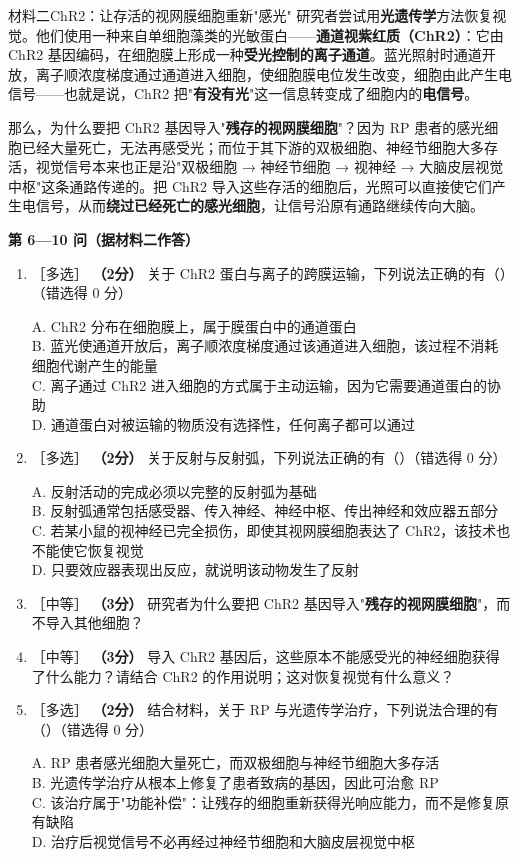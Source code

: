 \documentclass[UTF8,a4paper,11pt]{ctexart}
\newcommand{\pt}[1]{\textbf{（#1分）}}
\newcommand{\lv}[1]{{\small\color{deepgreen}［#1］}}
\newcommand{\tian}[1]{\underline{\hspace{#1}}}
\newcommand{\choice}[1]{\par\smallskip\noindent #1\par}
\begin{document}
\begin{matbox}{材料二\quad ChR2：让存活的视网膜细胞重新"感光"}
研究者尝试用\textbf{光遗传学}方法恢复视觉。他们使用一种来自单细胞藻类的光敏蛋白——\textbf{通道视紫红质（ChR2）}：它由 ChR2 基因编码，在细胞膜上形成一种\textbf{受光控制的离子通道}。蓝光照射时通道开放，离子顺浓度梯度通过通道进入细胞，使细胞膜电位发生改变，细胞由此产生电信号——也就是说，ChR2 把"\textbf{有没有光}"这一信息转变成了细胞内的\textbf{电信号}。

那么，为什么要把 ChR2 基因导入"\textbf{残存的视网膜细胞}"？因为 RP 患者的感光细胞已经大量死亡，无法再感受光；而位于其下游的双极细胞、神经节细胞大多存活，视觉信号本来也正是沿"双极细胞 → 神经节细胞 → 视神经 → 大脑皮层视觉中枢"这条通路传递的。把 ChR2 导入这些存活的细胞后，光照可以直接使它们产生电信号，从而\textbf{绕过已经死亡的感光细胞}，让信号沿原有通路继续传向大脑。
\end{matbox}

\begin{qbox}
\noindent\textbf{\color{deepgreen}第 6—10 问（据材料二作答）}
\begin{enumerate}[leftmargin=2.2em,itemsep=5pt,start=6]
\item \lv{多选} \pt{2} 关于 ChR2 蛋白与离子的跨膜运输，下列说法正确的有（\quad）（错选得 0 分）
\choice{A. ChR2 分布在细胞膜上，属于膜蛋白中的通道蛋白\\
B. 蓝光使通道开放后，离子顺浓度梯度通过该通道进入细胞，该过程不消耗细胞代谢产生的能量\\
C. 离子通过 ChR2 进入细胞的方式属于主动运输，因为它需要通道蛋白的协助\\
D. 通道蛋白对被运输的物质没有选择性，任何离子都可以通过}

\item \lv{多选} \pt{2} 关于反射与反射弧，下列说法正确的有（\quad）（错选得 0 分）
\choice{A. 反射活动的完成必须以完整的反射弧为基础\\
B. 反射弧通常包括感受器、传入神经、神经中枢、传出神经和效应器五部分\\
C. 若某小鼠的视神经已完全损伤，即使其视网膜细胞表达了 ChR2，该技术也不能使它恢复视觉\\
D. 只要效应器表现出反应，就说明该动物发生了反射}

\item \lv{中等} \pt{3} 研究者为什么要把 ChR2 基因导入"\textbf{残存的视网膜细胞}"，而不导入其他细胞？\tian{0.48\textwidth}

\item \lv{中等} \pt{3} 导入 ChR2 基因后，这些原本不能感受光的神经细胞获得了什么能力？请结合 ChR2 的作用说明；这对恢复视觉有什么意义？\tian{0.48\textwidth}

\item \lv{多选} \pt{2} 结合材料，关于 RP 与光遗传学治疗，下列说法合理的有（\quad）（错选得 0 分）
\choice{A. RP 患者感光细胞大量死亡，而双极细胞与神经节细胞大多存活\\
B. 光遗传学治疗从根本上修复了患者致病的基因，因此可治愈 RP\\
C. 该治疗属于"功能补偿"：让残存的细胞重新获得光响应能力，而不是修复原有缺陷\\
D. 治疗后视觉信号不必再经过神经节细胞和大脑皮层视觉中枢}
\end{enumerate}
\end{qbox}
\end{document}
